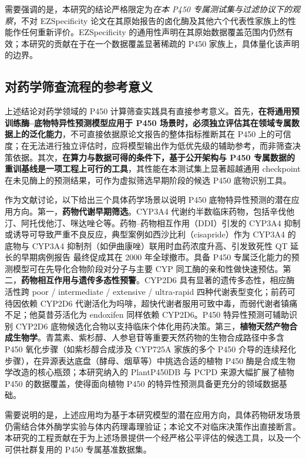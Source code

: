 需要强调的是，本研究的结论严格限定为\emph{在本 P450 专属测试集与过滤协议下的观察}，不对 EZSpecificity 论文在其原始报告的卤化酶及其他六个代表性家族上的性能作任何重新评价。EZSpecificity 的通用性声明在其原始数据覆盖范围内仍然有效；本研究的贡献在于在一个数据覆盖显著稀疏的 P450 家族上，具体量化该声明的边界。

\subsection{对药学筛查流程的参考意义}

上述结论对药学领域的 P450 计算筛查实践具有直接参考意义。首先，\textbf{在将通用预训练酶--底物特异性预测模型应用于 P450 场景时，必须独立评估其在领域专属数据上的泛化能力}，不可直接依据原论文报告的整体指标推断其在 P450 上的可信度；在无法进行独立评估时，应将模型输出作为低优先级的辅助参考，而非筛查决策依据。其次，\textbf{在算力与数据可得的条件下，基于公开架构与 P450 专属数据的重训基线是一项工程上可行的工具}，其性能在本测试集上显著超越通用 checkpoint 在未见酶上的预测结果，可作为虚拟筛选早期阶段的候选 P450 底物识别工具。

作为文献讨论，以下给出三个具体药学场景以说明 P450 底物特异性预测的潜在应用方向。第一，\textbf{药物代谢早期筛选}。CYP3A4 代谢约半数临床药物，包括辛伐他汀、阿托伐他汀、咪达唑仑等。药物--药物相互作用（DDI）引发的 CYP3A4 抑制或诱导可导致严重不良反应，典型案例如西沙比利（cisapride）作为 CYP3A4 的底物与 CYP3A4 抑制剂（如伊曲康唑）联用时血药浓度升高、引发致死性 QT 延长的早期病例报告\cite{Wysowski1996} 最终促成其在 2000 年全球撤市。具备 P450 专属泛化能力的预测模型可在先导化合物阶段对分子与主要 CYP 同工酶的亲和性做快速预估。第二，\textbf{药物相互作用与遗传多态性预警}。CYP2D6 具有显著的遗传多态性\cite{Zanger2013}，相应酶活性跨 poor / intermediate / extensive / ultra-rapid 四种代谢表型变化；前药可待因依赖 CYP2D6 代谢活化为吗啡，超快代谢者服用可致中毒，而弱代谢者镇痛不足；他莫昔芬活化为 endoxifen 同样依赖 CYP2D6\cite{Stearns2003}。P450 特异性预测可辅助识别 CYP2D6 底物候选化合物以支持临床个体化用药决策。第三，\textbf{植物天然产物合成生物学}。青蒿素、紫杉醇、人参皂苷等重要天然药物的生物合成路径中多含 P450 氧化步骤（如紫杉醇合成涉及 CYP725A 家族的多个 P450 介导的连续羟化步骤\cite{Kaspera2006}），在异源表达底盘（酵母、烟草等）中挑选合适的植物 P450 酶是合成生物学改造的核心瓶颈；本研究纳入的 PlantP450DB 与 PCPD 来源大幅扩展了植物 P450 的数据覆盖，使得面向植物 P450 的特异性预测具备更充分的领域数据基础。

需要说明的是，上述应用均为基于本研究模型的潜在应用方向，具体药物研发场景仍需结合体外酶学实验与体内药理毒理验证；本论文不对临床决策作出直接断言。本研究的工程贡献在于为上述场景提供一个经严格公平评估的候选工具，以及一个可供社群复用的 P450 专属基准数据集。

